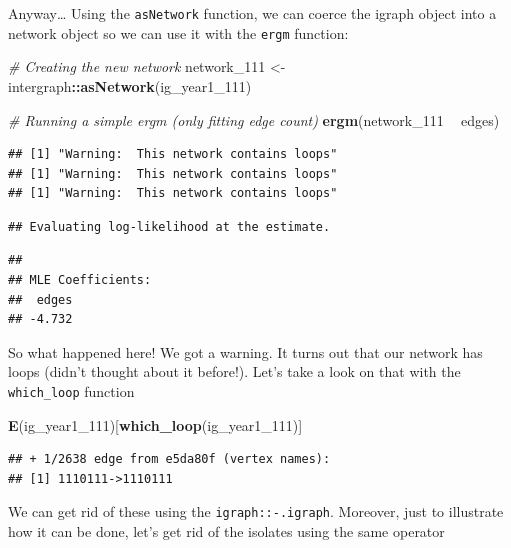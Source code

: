 \documentclass[]{book}
\newenvironment{Shaded}{\begin{snugshade}}{\end{snugshade}}
\newcommand{\KeywordTok}[1]{\textcolor[rgb]{0.13,0.29,0.53}{\textbf{#1}}}
\newcommand{\DecValTok}[1]{\textcolor[rgb]{0.00,0.00,0.81}{#1}}
\newcommand{\StringTok}[1]{\textcolor[rgb]{0.31,0.60,0.02}{#1}}
\newcommand{\CommentTok}[1]{\textcolor[rgb]{0.56,0.35,0.01}{\textit{#1}}}
\newcommand{\OperatorTok}[1]{\textcolor[rgb]{0.81,0.36,0.00}{\textbf{#1}}}
\newcommand{\NormalTok}[1]{#1}
\theoremstyle{definition}
\theoremstyle{definition}
\theoremstyle{definition}
\theoremstyle{remark}
\begin{document}
Anyway\ldots{} Using the \texttt{asNetwork} function, we can coerce the
igraph object into a network object so we can use it with the
\texttt{ergm} function:

\begin{Shaded}
\begin{Highlighting}[]
\CommentTok{# Creating the new network}
\NormalTok{network_}\DecValTok{111}\NormalTok{ <-}\StringTok{ }\NormalTok{intergraph}\OperatorTok{::}\KeywordTok{asNetwork}\NormalTok{(ig_year1_}\DecValTok{111}\NormalTok{)}

\CommentTok{# Running a simple ergm (only fitting edge count)}
\KeywordTok{ergm}\NormalTok{(network_}\DecValTok{111} \OperatorTok{~}\StringTok{ }\NormalTok{edges)}
\end{Highlighting}
\end{Shaded}

\begin{verbatim}
## [1] "Warning:  This network contains loops"
## [1] "Warning:  This network contains loops"
## [1] "Warning:  This network contains loops"
\end{verbatim}

\begin{verbatim}
## Evaluating log-likelihood at the estimate.
\end{verbatim}

\begin{verbatim}
## 
## MLE Coefficients:
##  edges  
## -4.732
\end{verbatim}

So what happened here! We got a warning. It turns out that our network
has loops (didn't thought about it before!). Let's take a look on that
with the \texttt{which\_loop} function

\begin{Shaded}
\begin{Highlighting}[]
\KeywordTok{E}\NormalTok{(ig_year1_}\DecValTok{111}\NormalTok{)[}\KeywordTok{which_loop}\NormalTok{(ig_year1_}\DecValTok{111}\NormalTok{)]}
\end{Highlighting}
\end{Shaded}

\begin{verbatim}
## + 1/2638 edge from e5da80f (vertex names):
## [1] 1110111->1110111
\end{verbatim}

We can get rid of these using the \texttt{igraph::-.igraph}. Moreover,
just to illustrate how it can be done, let's get rid of the isolates
using the same operator
\end{document}
